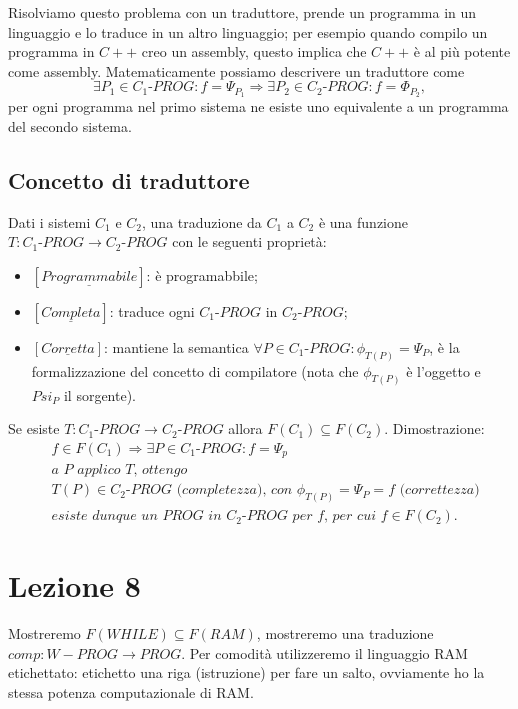 \documentclass{article}
\begin{document}
Risolviamo questo problema con un traduttore, prende un programma in un linguaggio e lo traduce in un altro linguaggio; per esempio quando compilo un programma in $C++$ creo un assembly, questo implica che $C++$ è al più potente come assembly. Matematicamente possiamo descrivere un traduttore come 
\begin{displaymath}
	\exists P_1 \in C_1 \textit{-PROG}: f=\Psi_{P_1} \Rightarrow \exists P_2 \in C_2\textit{-PROG}: f=\Phi_{P_2},
\end{displaymath}
per ogni programma nel primo sistema ne esiste uno equivalente a un programma del secondo sistema.


\subsection{Concetto di traduttore}
Dati i sistemi $C_1$ e $C_2$, una traduzione da $C_1$ a $C_2$ è una funzione $T: C_1\textit{-PROG} \rightarrow C_2\textit{-PROG}$ con le seguenti proprietà:
\begin{itemize}
	\item $[\underline{Programmabile}]$: è programabbile;
	\item $[\underline{Completa}]$: traduce ogni $C_1\textit{-PROG}$ in $C_2\textit{-PROG}$;
	\item $[\underline{Corretta}]$: mantiene la semantica $\forall P \in C_1\textit{-PROG}: \phi_{T(P)}=\Psi_P$, è la formalizzazione del concetto di compilatore (nota che $\phi_{T(P)}$ è l'oggetto e $Psi_P$ il sorgente).
\end{itemize}
Se esiste $T: C_1\textit{-PROG} \rightarrow C_2\textit{-PROG}$ allora $F(C_1) \subseteq F(C_2)$. Dimostrazione:
\begin{displaymath}
	\begin{split}
		&f \in F(C_1) \Rightarrow \exists P \in C_1\textit{-PROG}: f= \Psi_p \\
		&\textit{a $P$ applico T, ottengo}\\
		&T(P) \in C_2\textit{-PROG} \textit{ (completezza), con } \phi_{T(P)} = \Psi_P = f \textit{ (correttezza)} \\
		&\textit{esiste dunque un PROG in $C_2\textit{-PROG}$ per $f$, per cui }f \in F(C_2).
	\end{split}
\end{displaymath}


\section{Lezione 8}
Mostreremo $F(WHILE) \subseteq F(RAM)$, mostreremo una traduzione $comp:W-PROG \rightarrow PROG$. Per comodità utilizzeremo il linguaggio RAM etichettato: etichetto una riga (istruzione) per fare un salto, ovviamente ho la stessa potenza computazionale di RAM.
\end{document}
